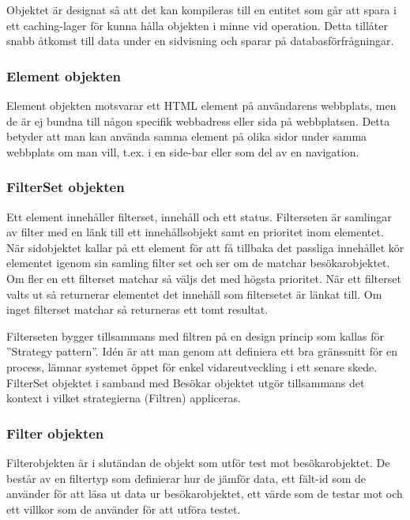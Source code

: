 Objektet är designat så att det kan kompileras till en entitet som går att spara i ett caching-lager för kunna hålla objekten i minne vid operation. Detta tillåter snabb åtkomst till data under en sidvisning och sparar på databasförfrågningar.

\subsubsection{Element objekten}



Element objekten motsvarar ett HTML element på användarens webbplats, men de är ej bundna till någon specifik webbadress eller sida på webbplatsen. Detta betyder att man kan använda samma element på olika sidor under samma webbplats om man vill, t.ex. i en side-bar eller som del av en navigation.

\subsubsection{FilterSet objekten}



Ett element innehåller filterset, innehåll och ett status. Filterseten är samlingar av filter med en länk till ett innehållsobjekt samt en prioritet inom elementet. När sidobjektet kallar på ett element för att få tillbaka det passliga innehållet kör elementet igenom sin samling filter set och ser om de matchar besökarobjektet. Om fler en ett filterset matchar så väljs det med högsta prioritet. När ett filterset valts ut så returnerar elementet det innehåll som filtersetet är länkat till. Om inget filterset matchar så returneras ett tomt resultat.

Filterseten bygger tillsammans med filtren på en design princip som kallas för ''Strategy pattern''. Idén är att man genom att definiera ett bra gränssnitt för en process, lämnar systemet öppet för enkel vidareutveckling i ett senare skede. \citep[s. 349]{gof} FilterSet objektet i samband med Besökar objektet utgör tillsammans det kontext i vilket strategierna (Filtren) appliceras.

\subsubsection{Filter objekten}



Filterobjekten är i slutändan de objekt som utför test mot besökarobjektet. De består av en filtertyp som definierar hur de jämför data, ett fält-id som de använder för att läsa ut data ur besökarobjektet, ett värde som de testar mot och ett villkor som de använder för att utföra testet.

